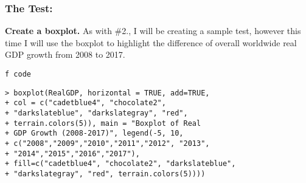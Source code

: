 \documentclass[12pt,a4paper]{article}
\begin{document}
\subsubsection*{The Test:}
\textbf{Create a boxplot.} As with \#2., I will be creating a sample test, however this time I will use the boxplot to highlight the difference of overall worldwide real GDP growth from 2008 to 2017.
\begin{framed}
\begin{verbatim}
f code
\end{verbatim}
\end{framed}
\begin{shaded}
\begin{framed}
\footnotesize{\color{BrickRed}
\begin{verbatim}
> boxplot(RealGDP, horizontal = TRUE, add=TRUE,
+ col = c("cadetblue4", "chocolate2",
+ "darkslateblue", "darkslategray", "red",
+ terrain.colors(5)), main = "Boxplot of Real
+ GDP Growth (2008-2017)", legend(-5, 10,
+ c("2008","2009","2010","2011","2012", "2013",
+ "2014","2015","2016","2017"),
+ fill=c("cadetblue4", "chocolate2", "darkslateblue",
+ "darkslategray", "red", terrain.colors(5))))
\end{verbatim}}
\end{framed}
\end{shaded}
\newpage
\end{document}
